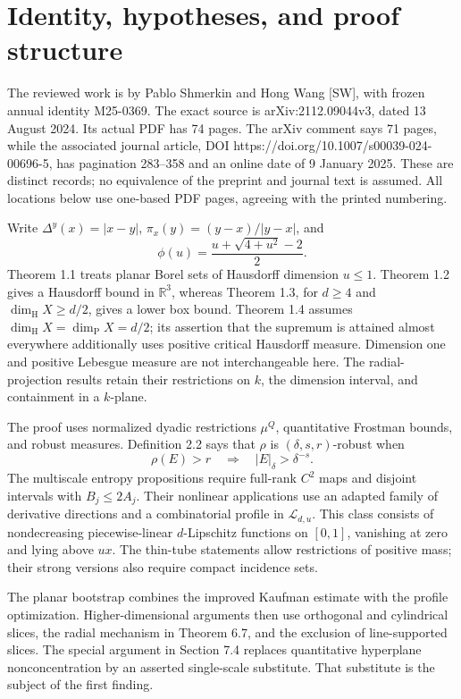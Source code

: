 \documentclass[10pt]{article}
\begin{document}
\section*{Identity, hypotheses, and proof structure}
The reviewed work is by Pablo Shmerkin and Hong Wang [SW], with frozen annual identity M25-0369. The exact source is arXiv:2112.09044v3, dated 13 August 2024. Its actual PDF has 74 pages. The arXiv comment says 71 pages, while the associated journal article, DOI https://doi.org/10.1007/s00039-024-00696-5, has pagination 283–358 and an online date of 9 January 2025. These are distinct records; no equivalence of the preprint and journal text is assumed. All locations below use one-based PDF pages, agreeing with the printed numbering.\par
Write \(\Delta^y(x)=|x-y|\), \(\pi_x(y)=(y-x)/|y-x|\), and \[\phi(u)=\frac{u+\sqrt{4+u^2}-2}{2}.\] Theorem 1.1 treats planar Borel sets of Hausdorff dimension \(u\le1\). Theorem 1.2 gives a Hausdorff bound in \(\mathbb R^3\), whereas Theorem 1.3, for \(d\ge4\) and \(\dim_{\mathrm H}X\ge d/2\), gives a lower box bound. Theorem 1.4 assumes \(\dim_{\mathrm H}X=\dim_{\mathrm P}X=d/2\); its assertion that the supremum is attained almost everywhere additionally uses positive critical Hausdorff measure. Dimension one and positive Lebesgue measure are not interchangeable here. The radial-projection results retain their restrictions on \(k\), the dimension interval, and containment in a \(k\)-plane.\par
The proof uses normalized dyadic restrictions \(\mu^Q\), quantitative Frostman bounds, and robust measures. Definition 2.2 says that \(\rho\) is \((\delta,s,r)\)-robust when \[\rho(E)>r\quad\Longrightarrow\quad |E|_\delta>\delta^{-s}.\] The multiscale entropy propositions require full-rank \(C^2\) maps and disjoint intervals with \(B_j\le2A_j\). Their nonlinear applications use an adapted family of derivative directions and a combinatorial profile in \(\mathcal L_{d,u}\). This class consists of nondecreasing piecewise-linear \(d\)-Lipschitz functions on \([0,1]\), vanishing at zero and lying above \(ux\). The thin-tube statements allow restrictions of positive mass; their strong versions also require compact incidence sets.\par
The planar bootstrap combines the improved Kaufman estimate with the profile optimization. Higher-dimensional arguments then use orthogonal and cylindrical slices, the radial mechanism in Theorem 6.7, and the exclusion of line-supported slices. The special argument in Section 7.4 replaces quantitative hyperplane nonconcentration by an asserted single-scale substitute. That substitute is the subject of the first finding.\par
\end{document}
